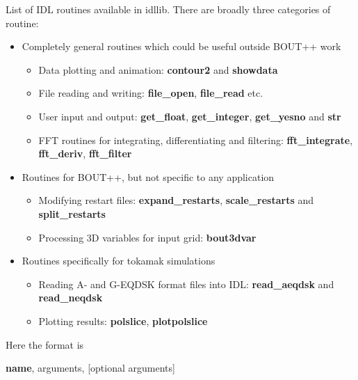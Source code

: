 \documentclass[12pt]{article}
\begin{document}
List of IDL routines available in idllib. There are broadly three categories
of routine:
\begin{itemize}
\item Completely general routines which could be useful outside BOUT++ work
  \begin{itemize}
  \item Data plotting and animation: {\bf contour2} and {\bf showdata}
  \item File reading and writing: {\bf file\_open}, {\bf file\_read} etc.
  \item User input and output: {\bf get\_float}, {\bf get\_integer}, {\bf get\_yesno} and {\bf str}
  \item FFT routines for integrating, differentiating and filtering: {\bf fft\_integrate}, {\bf fft\_deriv}, {\bf fft\_filter} 
  \end{itemize}
\item Routines for BOUT++, but not specific to any application
  \begin{itemize}
  \item Modifying restart files: {\bf expand\_restarts}, {\bf scale\_restarts} and {\bf split\_restarts}
  \item Processing 3D variables for input grid: {\bf bout3dvar}
  \end{itemize}
\item Routines specifically for tokamak simulations
  \begin{itemize}
  \item Reading A- and G-EQDSK format files into IDL: {\bf read\_aeqdsk} and {\bf read\_neqdsk}
  \item Plotting results: {\bf polslice}, {\bf plotpolslice}
  \end{itemize}
\end{itemize}

Here the format is

{\bf name}, arguments, [optional arguments]
\end{document}
